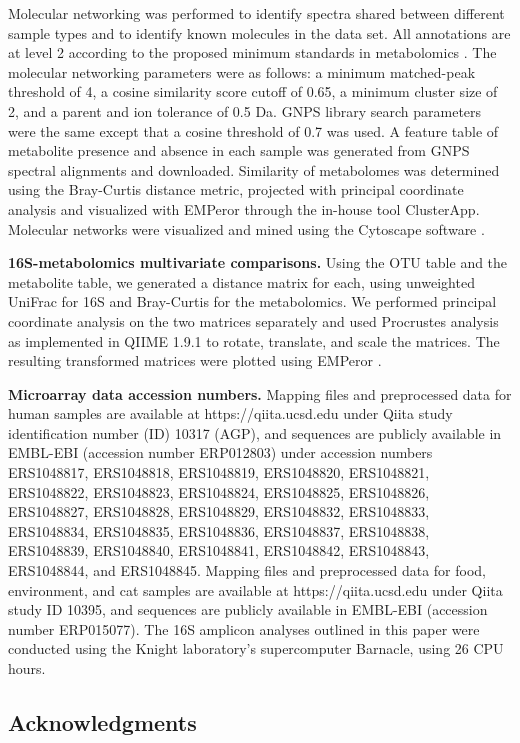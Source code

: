 Molecular networking was performed to identify spectra shared between different sample
types and to identify known molecules in the data set. All annotations are at level 2
according to the proposed minimum standards in metabolomics \cite{Sumner2007}. The
molecular networking parameters were as follows: a minimum matched-peak threshold
of 4, a cosine similarity score cutoff of 0.65, a minimum cluster size of 2, and a
parent and ion tolerance of 0.5 Da. GNPS library search parameters were the same
except that a cosine threshold of 0.7 was used. A feature table of metabolite
presence and absence in each sample was generated from GNPS spectral alignments
and downloaded. Similarity of metabolomes was determined using the Bray-Curtis
distance metric, projected with principal coordinate analysis and visualized with
EMPeror through the in-house tool ClusterApp. Molecular networks were visualized
and mined using the Cytoscape software \cite{Shannon2003}.

\textbf{16S-metabolomics multivariate comparisons.} Using the OTU table and the
metabolite table, we generated a distance matrix for each, using unweighted UniFrac
for 16S and Bray-Curtis for the metabolomics. We performed principal coordinate
analysis on the two matrices separately and used Procrustes analysis as implemented
in QIIME 1.9.1 to rotate, translate, and scale the matrices. The resulting
transformed matrices were plotted using EMPeror \cite{Vazquez-Baeza2013}.


\textbf{Microarray data accession numbers.} Mapping files and preprocessed data
for human samples are available at https://qiita.ucsd.edu under Qiita study
identification number (ID) 10317 (AGP), and sequences are publicly available in
EMBL-EBI (accession number ERP012803) under accession numbers ERS1048817, ERS1048818,
ERS1048819, ERS1048820, ERS1048821, ERS1048822, ERS1048823, ERS1048824, ERS1048825,
ERS1048826, ERS1048827, ERS1048828, ERS1048829, ERS1048832, ERS1048833, ERS1048834,
ERS1048835, ERS1048836, ERS1048837, ERS1048838, ERS1048839, ERS1048840, ERS1048841,
ERS1048842, ERS1048843, ERS1048844, and ERS1048845. Mapping files and preprocessed data
for food, environment, and cat samples are available at https://qiita.ucsd.edu under
Qiita study ID 10395, and sequences are publicly available in EMBL-EBI (accession
number ERP015077). The 16S amplicon analyses outlined in this paper were conducted
using the Knight laboratory’s supercomputer Barnacle, using 26 CPU hours.

\subsection{Acknowledgments}

